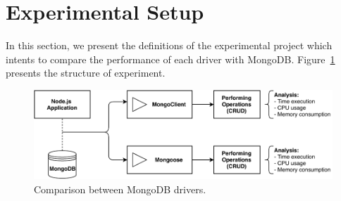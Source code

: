 \documentclass{svproc}
\begin{document}




\section{Experimental Setup}
\label{section:experimento}

In this section, we present the definitions of the experimental project which intents to compare the performance of each driver with MongoDB.
Figure~\ref{figure:diagrama-banco} presents the structure of experiment.

\begin{figure}[!ht]
    \centering
    \includegraphics[width=\textwidth]{images/esquema-experimento.pdf}
    \caption{Comparison between MongoDB drivers.}
    \label{figure:diagrama-banco}
\end{figure}
 
\end{document}
